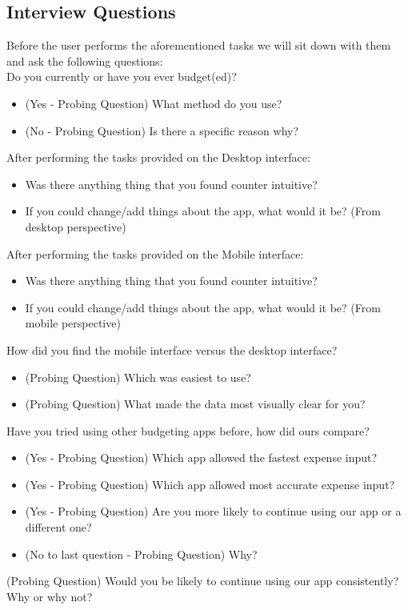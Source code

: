 \documentclass{chi2011}
\begin{document}
	\subsection{Interview Questions}
	Before the user performs the aforementioned tasks we will sit down with them and ask the following 
	questions:\\
    Do you currently or have you ever budget(ed)?
			\begin{itemize}
				\item (Yes - Probing Question) What method do you use?
				\item (No - Probing Question) Is there a specific reason why?
			\end{itemize}

    After performing the tasks provided on the Desktop interface:
	\begin{itemize}
		\item Was there anything thing that you found counter intuitive?
		\item If you could change/add things about the app, what would it be? (From desktop perspective)
	\end{itemize}

    After performing the tasks provided on the Mobile interface:
	\begin{itemize}
		\item Was there anything thing that you found counter intuitive?
		\item If you could change/add things about the app, what would it be? (From mobile perspective)
	\end{itemize}

	How did you find the mobile interface versus the desktop interface?
	\begin{itemize}
		\item (Probing Question) Which was easiest to use?
        \item (Probing Question) What made the data most visually clear for you?
	\end{itemize}
		
	Have you tried using other budgeting apps before, how did ours compare?
	\begin{itemize}
        \item (Yes - Probing Question) Which app allowed the fastest expense input?
        \item (Yes - Probing Question) Which app allowed most accurate expense input?
        \item (Yes - Probing Question) Are you more likely to continue using our app or a different one?
    \item (No to last question - Probing Question) Why?
	\end{itemize}
    (Probing Question) Would you be likely to continue using our app consistently? Why or why not?
\end{document}
